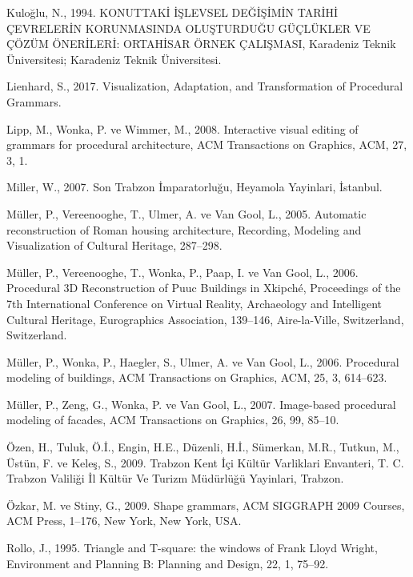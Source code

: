 \documentclass[12pt,turkish,a4paperpaper,]{report}
\begin{document}
\leavevmode\hypertarget{ref-Kuloglu:1994uy}{}%
Kuloğlu, N., 1994. KONUTTAKİ İŞLEVSEL DEĞİŞİMİN TARİHİ ÇEVRELERİN
KORUNMASINDA OLUŞTURDUĞU GÜÇLÜKLER VE ÇÖZÜM ÖNERİLERİ: ORTAHİSAR ÖRNEK
ÇALIŞMASI, Karadeniz Teknik Üniversitesi; Karadeniz Teknik Üniversitesi.

\leavevmode\hypertarget{ref-Lienhard:2017jv}{}%
Lienhard, S., 2017. Visualization, Adaptation, and Transformation of
Procedural Grammars.

\leavevmode\hypertarget{ref-Lipp:2008hv}{}%
Lipp, M., Wonka, P. ve Wimmer, M., 2008. Interactive visual editing of
grammars for procedural architecture, ACM Transactions on Graphics, ACM,
27, 3, 1.

\leavevmode\hypertarget{ref-Miller:2007uq}{}%
Miller, W., 2007. Son Trabzon İmparatorluğu, Heyamola Yayinlari,
İstanbul.

\leavevmode\hypertarget{ref-Muller:2005uf}{}%
Müller, P., Vereenooghe, T., Ulmer, A. ve Van Gool, L., 2005. Automatic
reconstruction of Roman housing architecture, Recording, Modeling and
Visualization of Cultural Heritage, 287--298.

\leavevmode\hypertarget{ref-Muller:2006hz}{}%
Müller, P., Vereenooghe, T., Wonka, P., Paap, I. ve Van Gool, L., 2006.
Procedural 3D Reconstruction of Puuc Buildings in Xkipché, Proceedings
of the 7th International Conference on Virtual Reality, Archaeology and
Intelligent Cultural Heritage, Eurographics Association, 139--146,
Aire-la-Ville, Switzerland, Switzerland.

\leavevmode\hypertarget{ref-Muller:2006fy}{}%
Müller, P., Wonka, P., Haegler, S., Ulmer, A. ve Van Gool, L., 2006.
Procedural modeling of buildings, ACM Transactions on Graphics, ACM, 25,
3, 614--623.

\leavevmode\hypertarget{ref-Muller:2007gu}{}%
Müller, P., Zeng, G., Wonka, P. ve Van Gool, L., 2007. Image-based
procedural modeling of facades, ACM Transactions on Graphics, 26, 99,
85--10.

\leavevmode\hypertarget{ref-Ozen:2009wo}{}%
Özen, H., Tuluk, Ö.İ., Engin, H.E., Düzenli, H.İ., Sümerkan, M.R.,
Tutkun, M., Üstün, F. ve Keleş, S., 2009. Trabzon Kent İçi Kültür
Varliklari Envanteri, T. C. Trabzon Valiliği İl Kültür Ve Turizm
Müdürlüğü Yayinlari, Trabzon.

\leavevmode\hypertarget{ref-Ozkar:2009ga}{}%
Özkar, M. ve Stiny, G., 2009. Shape grammars, ACM SIGGRAPH 2009 Courses,
ACM Press, 1--176, New York, New York, USA.

\leavevmode\hypertarget{ref-Rollo:1995bz}{}%
Rollo, J., 1995. Triangle and T-square: the windows of Frank Lloyd
Wright, Environment and Planning B: Planning and Design, 22, 1, 75--92.
\end{document}
